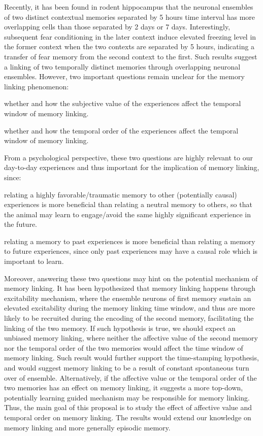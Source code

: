 \documentclass[master.tex]{subfiles}
\begin{document}
Recently, it has been found in rodent hippocampus that the neuronal ensembles of
two distinct contextual memories separated by 5 hours time interval has more
overlapping cells than those separated by 2 days or 7 days. Interestingly,
subsequent fear conditioning in the later context induce elevated freezing level
in the former context when the two contexts are separated by 5 hours, indicating
a transfer of fear memory from the second context to the first. Such results
suggest a linking of two temporally distinct memories through overlapping
neuronal ensembles. However, two important questions remain unclear for the
memory linking phenomenon:
\begin{inparaenum}[a)] \bfseries
\item whether and how the subjective value of the experiences affect the
  temporal window of memory linking.
\item whether and how the temporal order of the experiences affect the temporal
  window of memory linking.
\end{inparaenum}
From a psychological perspective, these two questions are highly relevant to our
day-to-day experiences and thus important for the implication of memory linking,
since:
\begin{inparaenum}[a)]
\item relating a highly favorable/traumatic memory to other (potentially causal)
  experiences is more beneficial than relating a neutral memory to others, so
  that the animal may learn to engage/avoid the same highly significant
  experience in the future.
\item relating a memory to past experiences is more beneficial than relating a
  memory to future experiences, since only past experiences may have a causal
  role which is important to learn.
\end{inparaenum}
Moreover, answering these two questions may hint on the potential mechanism of
memory linking. It has been hypothesized that memory linking happens through
excitability mechanism, where the ensemble neurons of first memory sustain an
elevated excitability during the memory linking time window, and thus are more
likely to be recruited during the encoding of the second memory, facilitating
the linking of the two memory. If such hypothesis is true, we should expect an
unbiased memory linking, where neither the affective value of the second memory
nor the temporal order of the two memories would affect the time window of
memory linking. Such result would further support the time-stamping hypothesis,
and would suggest memory linking to be a result of constant spontaneous turn
over of ensemble. Alternatively, if the affective value or the temporal order of
the two memories has an effect on memory linking, it suggests a more top-down,
potentially learning guided mechanism may be responsible for memory linking.
Thus, the main goal of this proposal is to study the effect of affective value
and temporal order on memory linking. The results would extend our knowledge on
memory linking and more generally episodic memory.
\end{document}

